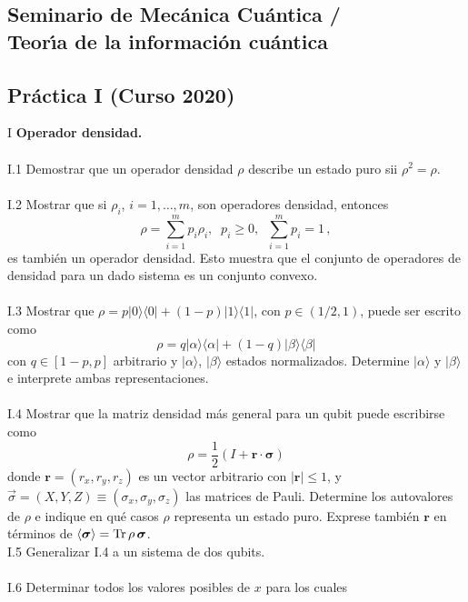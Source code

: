 \documentclass[12pt]{article}
\newcommand{\half}{\mbox{${\textstyle\frac{1}{2}}$}}
\begin{document}
\begin{center}
\subsection*{Seminario de Mec\'anica Cu\'antica / \\Teor\'{\i}a de la informaci\'on cu\'antica}
\subsection*{Pr\'actica I (Curso 2020)}
\end{center}
I {\bf Operador densidad.}\\
\\
I.1 Demostrar que un operador densidad $\rho$ describe un estado puro sii $\rho^2=\rho$. \\
\\
I.2 Mostrar que si $\rho_i$, $i=1,\ldots,m$, son operadores densidad, entonces \[\rho=\sum_{i=1}^m p_i \rho_i,\;\;p_i\geq 0,\;\;\sum_{i=1}^m p_i=1\,,\] es tambi\'en un operador densidad. 
Esto muestra que el conjunto de operadores de
densidad para un dado sistema es un conjunto convexo.\\ \\
I.3 Mostrar que $\rho=p|0\rangle\langle 0|+(1-p)|1\rangle\langle 1|$, con  $p\in(1/2,1)$, puede ser escrito  como 
\[\rho=q|\alpha\rangle\langle\alpha|+(1-q)|\beta\rangle\langle\beta|\]
con $q\in[1-p,p]$ arbitrario y $|\alpha\rangle$, $|\beta\rangle$ estados normalizados. Determine $|\alpha\rangle$ y $|\beta\rangle$ e interprete ambas representaciones. \\
\\
I.4  Mostrar que la matriz densidad m\'as general 
para un qubit puede escribirse como 
\[\rho=\half(I+\bm{r}\cdot\bm{\sigma})\]
donde $\bm{r}=(r_x,r_y,r_z)$ es un vector arbitrario con $|\bm{r}|\leq 1$, 
y $\vec{\sigma}=(X,Y,Z)\equiv(\sigma_x,\sigma_y,\sigma_z)$ las matrices de Pauli. Determine los autovalores de $\rho$ e indique en qu\'e casos $\rho$ representa un estado puro. Exprese tambi\'en $\bm{r}$ en t\'erminos de $\langle\bm{\sigma}\rangle={\rm Tr}\,\rho\,\bm{\sigma}$.  \hfill\break\\
I.5 Generalizar I.4 a un sistema de dos qubits. \\ \\
I.6 Determinar todos los valores posibles de $x$ para los cuales 
\end{document}
